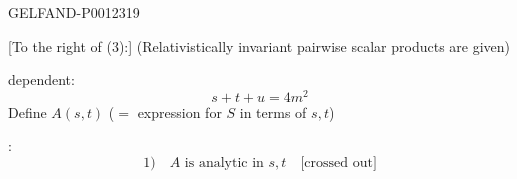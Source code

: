 \begin{GelfandAdjacentEvidence}{GELFAND-P001231}{9}

[To the right of (3):] (Relativistically invariant pairwise scalar products are given)

dependent:
\begin{equation*}
s+t+u=4m^2\tag{4}
\end{equation*}
Define \(A(s,t)\) (\(=\) expression for \(S\) in terms of \(s,t\))

:
\begin{equation*}
1)\quad A\text{ is analytic in }s,t\quad\text{[crossed out]}\tag{5}
\end{equation*}
\end{GelfandAdjacentEvidence}



